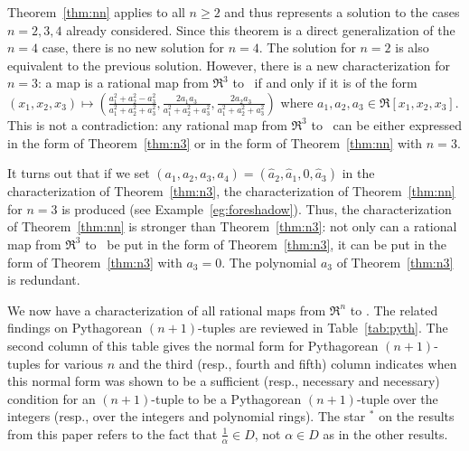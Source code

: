 Theorem~\ref{thm:nn} applies to all $n \geq 2$ and thus represents 
a solution to the cases $n=2,3,4$ already considered.
Since this theorem is a direct generalization of the $n=4$ case,
there is no new solution for $n=4$.
The solution for $n=2$ is also 
equivalent to the previous solution.
However, there is a new characterization for $n=3$:
a map is a rational map from $\Re^3$ to \ if and only if it is of
the form $(x_1,x_2,x_3) \mapsto 
(\frac{a_1^2 + a_2^2 - a_3^2}{a_1^2 + a_2^2 + a_3^2}, 
 \frac{2a_1a_3}{a_1^2 + a_2^2 + a_3^2}, 
 \frac{2a_2a_3}{a_1^2 + a_2^2 + a_3^2})$
where $a_1,a_2,a_3 \in \Re[x_1,x_2,x_3]$.
This is not a contradiction: any rational map
from $\Re^3$ to \ can be either expressed in the form of 
Theorem~\ref{thm:n3} or in the form of Theorem~\ref{thm:nn} with $n=3$.

It turns out that if we set 
$(a_1,a_2,a_3,a_4) = (\hat{a}_2, \hat{a}_1, 0, \hat{a}_3)$
in the characterization of Theorem~\ref{thm:n3},
the characterization of Theorem~\ref{thm:nn} for $n=3$ is produced
(see Example~\ref{eg:foreshadow}).
Thus, the characterization of Theorem~\ref{thm:nn} is stronger than
Theorem~\ref{thm:n3}: not only can a rational map from $\Re^3$ to \ 
be put in the form of Theorem~\ref{thm:n3}, it can be put in the form
of Theorem~\ref{thm:n3} with $a_3=0$.
The polynomial $a_3$ of Theorem~\ref{thm:n3} is redundant.

We now have a characterization of all rational maps from $\Re^n$ to .
The related findings on Pythagorean $(n+1)$-tuples are reviewed 
in Table~\ref{tab:pyth}.
The second column of this table gives the normal form for Pythagorean
$(n+1)$-tuples for various $n$
and the third (resp., fourth and fifth) column indicates when this
normal form was shown to be a sufficient (resp., necessary and necessary) 
condition for an $(n+1)$-tuple to be
a Pythagorean $(n+1)$-tuple over the integers
(resp., over the integers and polynomial rings).
The star $^*$ on the results from this paper refers to the fact that
$\frac{1}{\alpha} \in D$, not $\alpha \in D$ as in the other results.

